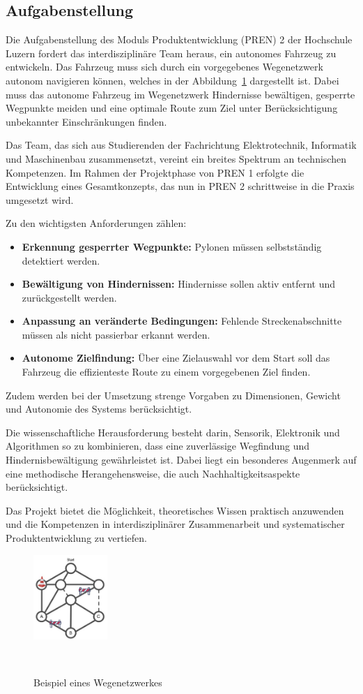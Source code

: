 \documentclass[main.tex]{subfiles} %
\begin{document}

\subsection{Aufgabenstellung}

Die Aufgabenstellung des Moduls Produktentwicklung (PREN) 2 der
Hochschule Luzern fordert das interdisziplinäre Team heraus, ein autonomes 
Fahrzeug zu entwickeln. Das Fahrzeug muss sich durch ein vorgegebenes Wegenetzwerk autonom navigieren können, welches in der Abbildung~\ref{fig:Wegenetzwerk_Aufgabenstellung} dargestellt ist.
Dabei muss das autonome Fahrzeug im Wegenetzwerk Hindernisse bewältigen, gesperrte Wegpunkte meiden und eine optimale 
Route zum Ziel unter Berücksichtigung unbekannter Einschränkungen finden.

Das Team, das sich aus Studierenden der Fachrichtung Elektrotechnik, Informatik und Maschinenbau 
zusammensetzt, vereint ein breites Spektrum an technischen Kompetenzen. Im Rahmen der Projektphase von PREN 1 
erfolgte die Entwicklung eines Gesamtkonzepts, das nun in PREN 2 schrittweise in die Praxis umgesetzt wird.

Zu den wichtigsten Anforderungen zählen:
\begin{itemize}
    \item \textbf{Erkennung gesperrter Wegpunkte:} Pylonen müssen selbstständig detektiert werden.
    \item \textbf{Bewältigung von Hindernissen:} Hindernisse sollen aktiv entfernt und zurückgestellt werden.
    \item \textbf{Anpassung an veränderte Bedingungen:} Fehlende Streckenabschnitte müssen als nicht passierbar erkannt werden.
    \item \textbf{Autonome Zielfindung:} Über eine Zielauswahl vor dem Start soll das Fahrzeug die effizienteste Route zu einem vorgegebenen Ziel finden.
\end{itemize}

Zudem werden bei der Umsetzung strenge Vorgaben zu Dimensionen, Gewicht und
Autonomie des Systems berücksichtigt.

Die wissenschaftliche Herausforderung besteht darin, Sensorik, Elektronik 
und Algorithmen so zu kombinieren, dass eine zuverlässige Wegfindung und 
Hindernisbewältigung gewährleistet ist. Dabei liegt ein besonderes Augenmerk auf 
eine methodische Herangehensweise, die auch Nachhaltigkeitsaspekte berücksichtigt.

Das Projekt bietet die Möglichkeit, theoretisches Wissen praktisch 
anzuwenden und die Kompetenzen in interdisziplinärer Zusammenarbeit 
und systematischer Produktentwicklung zu vertiefen.

\begin{figure}[H]
    \centering
    \includegraphics[width=0.25\textwidth]{Wegenetzwerk_Aufgabenstellung.pdf}
    \caption{Beispiel eines Wegenetzwerkes}~\label{fig:Wegenetzwerk_Aufgabenstellung}
\end{figure}
\end{document}
